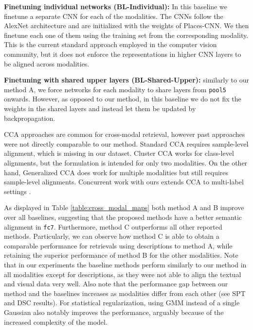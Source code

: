 \documentclass[10pt,journal,compsoc]{IEEEtran}
\begin{document}
	\textbf{Finetuning individual networks (BL-Individual):} In this baseline we finetune a separate CNN for each of the modalities. The CNNs follow the AlexNet \cite{krizhevsky2012imagenet} architecture and are initialized with the weights of Places-CNN. We then finetune each one of them using the training set from the corresponding modality. This is the current standard approach employed in the computer vision community, but it does not enforce the representations in higher CNN layers to be aligned across modalities. 
	
	\textbf{Finetuning with shared upper layers (BL-Shared-Upper):} similarly to our method A, we force networks for each modality to share layers from \texttt{pool5} onwards. However, as opposed to our method, in this baseline we do not fix the weights in the shared layers and instead let them be updated by backpropagation.
	
	
	CCA approaches are common for cross-modal retrieval, however past approaches were not directly comparable to our method. Standard CCA requires sample-level alignment, which is missing in our dataset. Cluster CCA \cite{rasiwasia2014cluster} works for class-level alignments, but the formulation is intended for only two modalities. On the other hand, Generalized CCA \cite{hardoon2004canonical} does work for multiple modalities but still requires sample-level alignments. Concurrent work with ours extends CCA to multi-label settings \cite{ranjan2015multi}.
	
	As displayed in Table \ref{table:cross_modal_maps} both method A and B improve over all baselines, suggesting that the proposed methods have a better semantic alignment in \texttt{fc7}. Furthermore, method C outperforms all other reported methods. Particularly, we can observe how method C is able to obtain a comparable performance for retrievals using descriptions to method A, while retaining the superior performance of method B for the other modalities. Note that in our experiments the baseline methods perform similarly to our method in all modalities except for descriptions, as they were not able to align the textual and visual data very well. Also note that the performance gap between our method and the baselines increases as modalities differ from each other (see SPT and DSC results).
	For statistical regularization, using GMM instead of a single Gaussian also notably improves the performance, arguably because of the increased complexity of the model.
	
\end{document}
